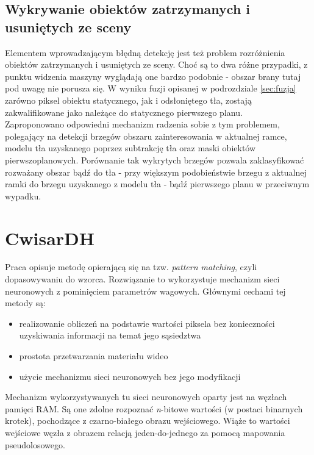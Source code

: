 \subsection{Wykrywanie obiektów zatrzymanych i usuniętych ze sceny}
Elementem wprowadzającym błędną detekcję jest też problem rozróżnienia obiektów zatrzymanych i usuniętych ze sceny. Choć są to dwa różne przypadki, z punktu widzenia maszyny wyglądają one bardzo podobnie - obszar brany tutaj pod uwagę nie porusza się. W wyniku fuzji opisanej w podrozdziale \ref{sec:fuzja} zarówno piksel obiektu statycznego, jak i odsłoniętego tła, zostają zakwalifikowane jako należące do statycznego pierwszego planu.\\
Zaproponowano odpowiedni mechanizm radzenia sobie z tym problemem, polegający na detekcji brzegów obszaru zainteresowania w aktualnej ramce, modelu tła uzyskanego poprzez subtrakcję tła oraz maski obiektów pierwszoplanowych. Porównanie tak wykrytych brzegów pozwala zaklasyfikować rozważany obszar bądź do tła - przy większym podobieństwie brzegu z aktualnej ramki do brzegu uzyskanego z modelu tła - bądź pierwszego planu w przeciwnym wypadku. 
\section{CwisarDH}
Praca \cite{6910014} opisuje metodę opierającą się na tzw. \textit{pattern matching}, czyli dopasowywaniu do wzorca. Rozwiązanie to wykorzystuje mechanizm sieci neuronowych z pominięciem parametrów wagowych. Głównymi cechami tej metody są:
\begin{itemize}
\item realizowanie obliczeń na podstawie wartości piksela bez konieczności uzyskiwania informacji na temat jego sąsiedztwa
\item prostota przetwarzania materiału wideo
\item użycie mechanizmu sieci neuronowych bez jego modyfikacji
\end{itemize}
Mechanizm wykorzystywanych tu sieci neuronowych oparty jest na węzłach pamięci RAM. Są one zdolne rozpoznać \textit{n}-bitowe wartości (w postaci binarnych krotek), pochodzące z czarno-białego obrazu wejściowego. Wiąże to wartości wejściowe węzła z obrazem relacją jeden-do-jednego za pomocą mapowania pseudolosowego.
